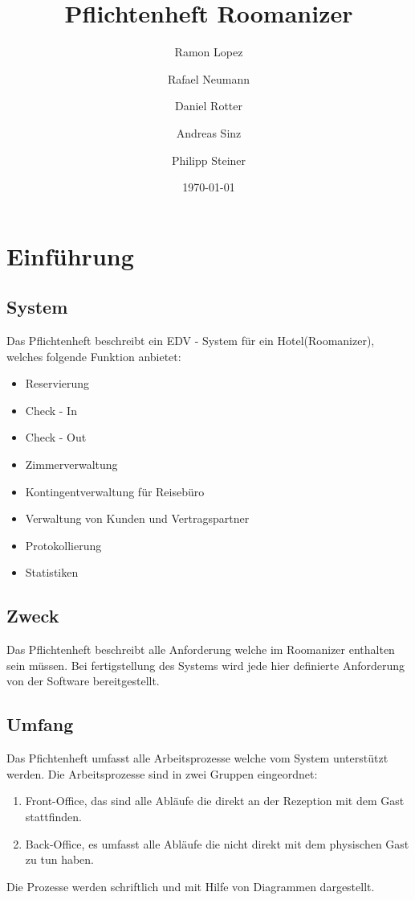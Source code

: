 \documentclass[10pt,a4paper,titlepage]{article}
\begin{document}
\fancyhf{}

\lhead{\leftmark}

\setcounter{secnumdepth}{5}
\setcounter{tocdepth}{3}

\title{Pflichtenheft Roomanizer}
\author{Ramon Lopez \and Rafael Neumann \and Daniel Rotter \and Andreas Sinz \and Philipp Steiner}
\date{\today}
\maketitle

\tableofcontents
\newpage

\section{Einführung}
\subsection{System}
Das Pflichtenheft beschreibt ein EDV - System für ein Hotel(Roomanizer), welches 
folgende Funktion anbietet:
\begin{itemize}
	\item Reservierung
	\item Check - In
	\item Check - Out
	\item Zimmerverwaltung
	\item Kontingentverwaltung für Reisebüro
	\item Verwaltung von Kunden und Vertragspartner
	\item Protokollierung
	\item Statistiken
\end{itemize}

\subsection{Zweck}
 Das Pflichtenheft beschreibt alle Anforderung welche im Roomanizer enthalten sein müssen. Bei fertigstellung des Systems wird jede hier definierte Anforderung von der Software bereitgestellt.

\subsection{Umfang}
Das Pfichtenheft umfasst alle Arbeitsprozesse welche vom System unterstützt werden. 
Die Arbeitsprozesse sind in zwei Gruppen eingeordnet:
\begin{enumerate}
\item Front-Office, das sind alle Abläufe die direkt an der Rezeption mit dem Gast stattfinden.
\item Back-Office, es umfasst alle Abläufe die nicht direkt mit dem physischen Gast zu tun haben.
\end{enumerate}
Die Prozesse werden schriftlich und mit Hilfe von Diagrammen dargestellt.
\end{document}
